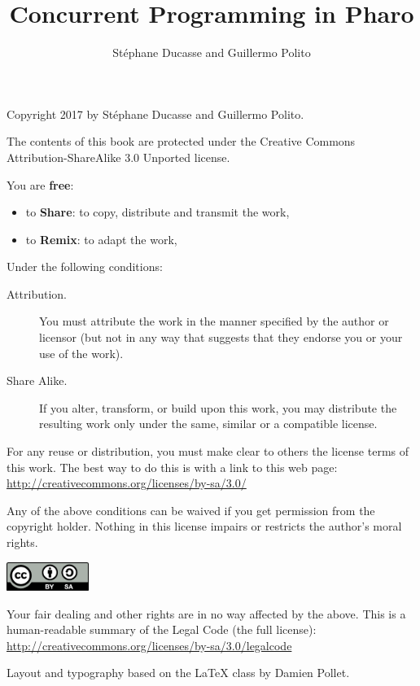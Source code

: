 \documentclass[10pt,twoside,english]{_support/latex/sbabook/sbabook}
\title{Concurrent Programming in Pharo}
\author{Stéphane Ducasse and Guillermo Polito}
\begin{document}
\maketitle
\pagestyle{titlingpage}
\thispagestyle{titlingpage} %

\cleartoverso
{\small

  Copyright 2017 by Stéphane Ducasse and Guillermo Polito.

  The contents of this book are protected under the Creative Commons
  Attribution-ShareAlike 3.0 Unported license.

  You are \textbf{free}:
  \begin{itemize}
  \item to \textbf{Share}: to copy, distribute and transmit the work,
  \item to \textbf{Remix}: to adapt the work,
  \end{itemize}

  Under the following conditions:
  \begin{description}
  \item[Attribution.] You must attribute the work in the manner specified by the
    author or licensor (but not in any way that suggests that they endorse you
    or your use of the work).
  \item[Share Alike.] If you alter, transform, or build upon this work, you may
    distribute the resulting work only under the same, similar or a compatible
    license.
  \end{description}

  For any reuse or distribution, you must make clear to others the
  license terms of this work. The best way to do this is with a link to
  this web page: \\
  \url{http://creativecommons.org/licenses/by-sa/3.0/}

  Any of the above conditions can be waived if you get permission from
  the copyright holder. Nothing in this license impairs or restricts the
  author's moral rights.

  \begin{center}
    \includegraphics[width=0.2\textwidth]{_support/latex/sbabook/CreativeCommons-BY-SA.pdf}
  \end{center}

  Your fair dealing and other rights are in no way affected by the
  above. This is a human-readable summary of the Legal Code (the full
  license): \\
  \url{http://creativecommons.org/licenses/by-sa/3.0/legalcode}

  \vfill

  Layout and typography based on the  \LaTeX{} class by Damien
  Pollet.
}
\end{document}
